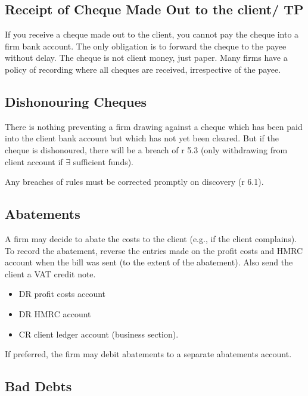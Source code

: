 \documentclass[
]{article}
\providecommand{\tightlist}{%
  \setlength{\itemsep}{0pt}\setlength{\parskip}{0pt}}
\begin{document}
\hypertarget{receipt-of-cheque-made-out-to-the-client-tp}{%
\subsection{Receipt of Cheque Made Out to the client/
TP}\label{receipt-of-cheque-made-out-to-the-client-tp}}

If you receive a cheque made out to the client, you cannot pay the
cheque into a firm bank account. The only obligation is to forward the
cheque to the payee without delay. The cheque is not client money, just
paper. Many firms have a policy of recording where all cheques are
received, irrespective of the payee.

\hypertarget{dishonouring-cheques}{%
\subsection{Dishonouring Cheques}\label{dishonouring-cheques}}

There is nothing preventing a firm drawing against a cheque which has
been paid into the client bank account but which has not yet been
cleared. But if the cheque is dishonoured, there will be a breach of r
5.3 (only withdrawing from client account if \(\exists\) sufficient
funds).

Any breaches of rules must be corrected promptly on discovery (r 6.1).

\hypertarget{abatements}{%
\subsection{Abatements}\label{abatements}}

A firm may decide to abate the costs to the client (e.g., if the client
complains). To record the abatement, reverse the entries made on the
profit costs and HMRC account when the bill was sent (to the extent of
the abatement). Also send the client a VAT credit note.

\begin{itemize}
\tightlist
\item
  DR profit costs account
\item
  DR HMRC account
\item
  CR client ledger account (business section).
\end{itemize}

If preferred, the firm may debit abatements to a separate abatements
account.

\hypertarget{bad-debts}{%
\subsection{Bad Debts}\label{bad-debts}}
\end{document}
